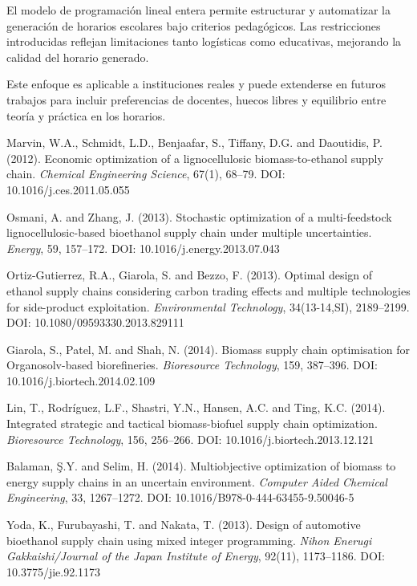 \documentclass[12pt]{article}
\begin{document}
El modelo de programación lineal entera permite estructurar y automatizar la generación de horarios escolares bajo criterios pedagógicos. Las restricciones introducidas reflejan limitaciones tanto logísticas como educativas, mejorando la calidad del horario generado. 

Este enfoque es aplicable a instituciones reales y puede extenderse en futuros trabajos para incluir preferencias de docentes, huecos libres y equilibrio entre teoría y práctica en los horarios.


\begin{thebibliography}{10}

Marvin, W.A., Schmidt, L.D., Benjaafar, S., Tiffany, D.G. and Daoutidis, P. (2012). 
Economic optimization of a lignocellulosic biomass-to-ethanol supply chain. 
\textit{Chemical Engineering Science}, 67(1), 68--79. 
DOI: 10.1016/j.ces.2011.05.055

Osmani, A. and Zhang, J. (2013). 
Stochastic optimization of a multi-feedstock lignocellulosic-based bioethanol supply chain under multiple uncertainties. 
\textit{Energy}, 59, 157--172. 
DOI: 10.1016/j.energy.2013.07.043

Ortiz-Gutierrez, R.A., Giarola, S. and Bezzo, F. (2013). 
Optimal design of ethanol supply chains considering carbon trading effects and multiple technologies for side-product exploitation. 
\textit{Environmental Technology}, 34(13-14,SI), 2189--2199. 
DOI: 10.1080/09593330.2013.829111

Giarola, S., Patel, M. and Shah, N. (2014). 
Biomass supply chain optimisation for Organosolv-based biorefineries. 
\textit{Bioresource Technology}, 159, 387--396. 
DOI: 10.1016/j.biortech.2014.02.109

Lin, T., Rodríguez, L.F., Shastri, Y.N., Hansen, A.C. and Ting, K.C. (2014). 
Integrated strategic and tactical biomass-biofuel supply chain optimization. 
\textit{Bioresource Technology}, 156, 256--266. 
DOI: 10.1016/j.biortech.2013.12.121

Balaman, Ş.Y. and Selim, H. (2014). 
Multiobjective optimization of biomass to energy supply chains in an uncertain environment. 
\textit{Computer Aided Chemical Engineering}, 33, 1267--1272. 
DOI: 10.1016/B978-0-444-63455-9.50046-5

Yoda, K., Furubayashi, T. and Nakata, T. (2013). 
Design of automotive bioethanol supply chain using mixed integer programming. 
\textit{Nihon Enerugi Gakkaishi/Journal of the Japan Institute of Energy}, 92(11), 1173--1186. 
DOI: 10.3775/jie.92.1173


\end{thebibliography}
\end{document}
